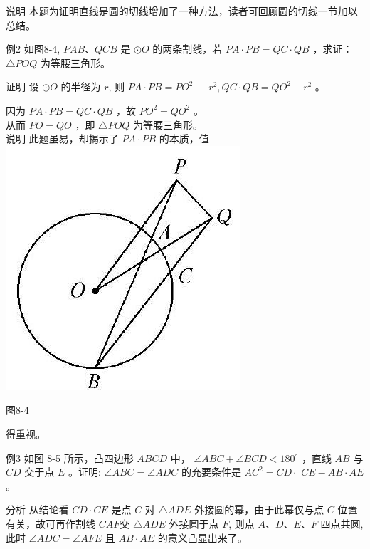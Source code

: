 \documentclass[10pt]{article}
\begin{document}
说明 本题为证明直线是圆的切线增加了一种方法，读者可回顾圆的切线一节加以总结。

例2 如图8-4, $P A B 、 Q C B$ 是 $\odot O$ 的两条割线，若 $P A \cdot P B=Q C \cdot Q B$ ，求证： $\triangle P O Q$ 为等腰三角形。

证明 设 $\odot O$ 的半径为 $r$, 则 $P A \cdot P B=P O^{2}-$ $r^{2}, Q C \cdot Q B=Q O^{2}-r^{2}$ 。

因为 $P A \cdot P B=Q C \cdot Q B$ ，故 $P O^{2}=Q O^{2}$ 。\\
从而 $P O=Q O$ ，即 $\triangle P O Q$ 为等腰三角形。\\
说明 此题虽易，却揭示了 $P A \cdot P B$ 的本质，值\\
\includegraphics[max width=\textwidth, center]{2024_10_30_66b8e5e701da2093c133g-059(1)}

图8-4

得重视。

例3 如图 8-5 所示，凸四边形 $A B C D$ 中， $\angle A B C+\angle B C D<180^{\circ}$ ，直线 $A B$ 与 $C D$ 交于点 $E$ 。证明: $\angle A B C=\angle A D C$ 的充要条件是 $A C^{2}=C D \cdot$ $C E-A B \cdot A E$ 。

分析 从结论看 $C D \cdot C E$ 是点 $C$ 对 $\triangle A D E$ 外接圆的幂，由于此幂仅与点 $C$ 位置有关，故可再作割线 $C A F$交 $\triangle A D E$ 外接圆于点 $F$, 则点 $A 、 D 、 E 、 F$ 四点共圆, 此时 $\angle A D C=\angle A F E$ 且 $A B \cdot A E$ 的意义凸显出来了。
\end{document}
